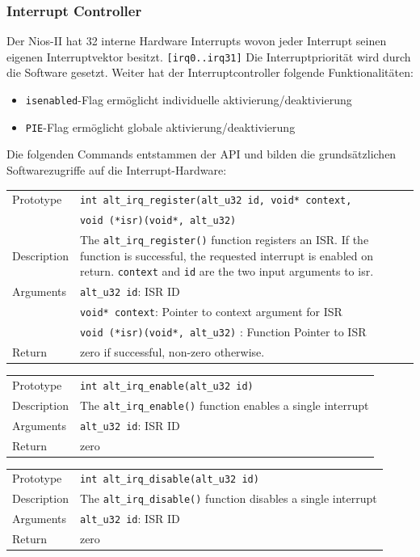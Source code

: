 \documentclass[11pt,a4paper,oneside]{scrartcl}
\def\code#1{\texttt{#1}}
\begin{document}
\subsubsection{Interrupt Controller}
Der Nios-II hat 32 interne Hardware Interrupts wovon jeder Interrupt seinen eigenen Interruptvektor besitzt. \code{[irq0..irq31]} Die Interruptpriorität wird durch die Software gesetzt. Weiter hat der Interruptcontroller folgende Funktionalitäten:
\begin{itemize}
\item \code{isenabled}-Flag ermöglicht individuelle aktivierung/deaktivierung
\item \code{PIE}-Flag ermöglicht globale aktivierung/deaktivierung
\end{itemize}
Die folgenden Commands entstammen der API und bilden die grundsätzlichen Softwarezugriffe auf die Interrupt-Hardware:
\begin{table}[h]
\begin{tabular}[t]{p{} p{} }
Prototype & \lstinline$int alt_irq_register(alt_u32 id, void* context, $ \\
& \lstinline$void (*isr)(void*, alt_u32)$  \\
Description & The \lstinline$alt_irq_register()$ function registers an ISR. If the function is successful, the requested interrupt is enabled on return. \lstinline$context$ and \lstinline$id$ are the two input arguments to isr.\\
Arguments & \lstinline$alt_u32 id$:	ISR ID \\
 & \lstinline$void* context$: 	Pointer to context argument for ISR\\
 & \lstinline$void (*isr)(void*, alt_u32)$ : Function Pointer to ISR\\
Return &  zero if successful, non-zero otherwise. 
\end{tabular}
\end{table}
\begin{table}[h!]
\begin{tabular}[t]{p{} p{} }
Prototype & \lstinline$int alt_irq_enable(alt_u32 id)$ \\
Description & The \lstinline$alt_irq_enable()$ function enables a single interrupt\\
Arguments & \lstinline$alt_u32 id$:	ISR ID \\
Return &  zero
\end{tabular}
\end{table}
\begin{table}[h!]
\begin{tabular}[t]{p{} p{} }
Prototype & \lstinline$int alt_irq_disable(alt_u32 id)$ \\
Description & The \lstinline$alt_irq_disable()$ function disables a single interrupt\\
Arguments & \lstinline$alt_u32 id$:	ISR ID \\
Return &  zero
\end{tabular}
\end{table}
\end{document}
